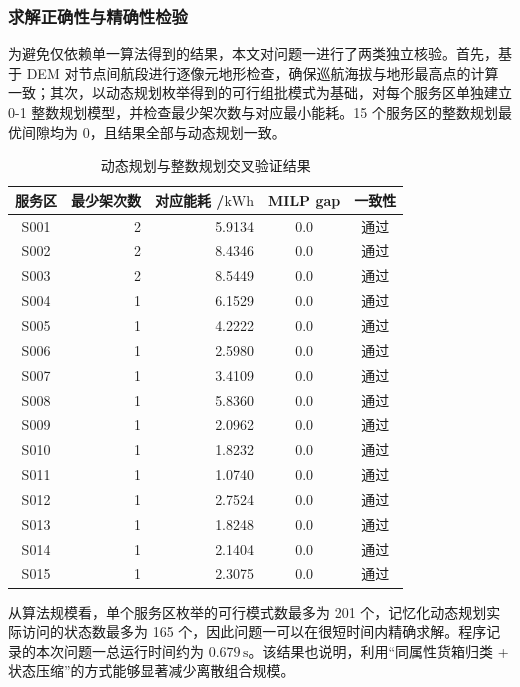 \documentclass[bwprint,fontset=fandol]{gmcmthesis}
\begin{document}
\subsubsection{求解正确性与精确性检验}

为避免仅依赖单一算法得到的结果，本文对问题一进行了两类独立核验。首先，基于 DEM 对节点间航段进行逐像元地形检查，确保巡航海拔与地形最高点的计算一致；其次，以动态规划枚举得到的可行组批模式为基础，对每个服务区单独建立 0-1 整数规划模型，并检查最少架次数与对应最小能耗。15 个服务区的整数规划最优间隙均为 0，且结果全部与动态规划一致。

\begin{table}[H]
  \centering
  \small
  \setlength{\tabcolsep}{5pt}
  \renewcommand{\arraystretch}{1.15}
  \caption{动态规划与整数规划交叉验证结果}
  \label{tab:q1-validation}
  \begin{tabular*}{0.92\linewidth}{@{\extracolsep{\fill}}crrcc@{}}
    \toprule
    服务区 & 最少架次数 & \shortstack{对应能耗\\ /$\mathrm{kWh}$} & MILP gap & 一致性 \\
    \midrule
    S001 & 2 & 5.9134 & 0.0 & 通过 \\
    S002 & 2 & 8.4346 & 0.0 & 通过 \\
    S003 & 2 & 8.5449 & 0.0 & 通过 \\
    S004 & 1 & 6.1529 & 0.0 & 通过 \\
    S005 & 1 & 4.2222 & 0.0 & 通过 \\
    S006 & 1 & 2.5980 & 0.0 & 通过 \\
    S007 & 1 & 3.4109 & 0.0 & 通过 \\
    S008 & 1 & 5.8360 & 0.0 & 通过 \\
    S009 & 1 & 2.0962 & 0.0 & 通过 \\
    S010 & 1 & 1.8232 & 0.0 & 通过 \\
    S011 & 1 & 1.0740 & 0.0 & 通过 \\
    S012 & 1 & 2.7524 & 0.0 & 通过 \\
    S013 & 1 & 1.8248 & 0.0 & 通过 \\
    S014 & 1 & 2.1404 & 0.0 & 通过 \\
    S015 & 1 & 2.3075 & 0.0 & 通过 \\
    \bottomrule
  \end{tabular*}
\end{table}

从算法规模看，单个服务区枚举的可行模式数最多为 201 个，记忆化动态规划实际访问的状态数最多为 165 个，因此问题一可以在很短时间内精确求解。程序记录的本次问题一总运行时间约为 $0.679\,\mathrm{s}$。该结果也说明，利用“同属性货箱归类 + 状态压缩”的方式能够显著减少离散组合规模。
\end{document}
